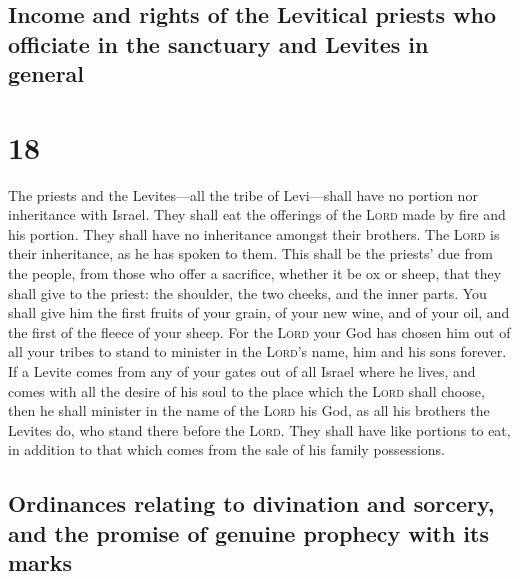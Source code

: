 \hypertarget{income-and-rights-of-the-levitical-priests-who-officiate-in-the-sanctuary-and-levites-in-general}{%
\subsection{Income and rights of the Levitical priests who officiate in
the sanctuary and Levites in
general}\label{income-and-rights-of-the-levitical-priests-who-officiate-in-the-sanctuary-and-levites-in-general}}

\hypertarget{section-17}{%
\section{18}\label{section-17}}

 The priests and the Levites---all the tribe of
Levi---shall have no portion nor inheritance with Israel. They shall eat
the offerings of the \textsc{Lord} made by fire and his portion.
 They shall have no inheritance amongst their brothers.
The \textsc{Lord} is their inheritance, as he has spoken to them.
 This shall be the priests' due from the people, from
those who offer a sacrifice, whether it be ox or sheep, that they shall
give to the priest: the shoulder, the two cheeks, and the inner parts.
 You shall give him the first fruits of your grain, of
your new wine, and of your oil, and the first of the fleece of your
sheep.  For the \textsc{Lord} your God has chosen him out
of all your tribes to stand to minister in the \textsc{Lord}'s name, him
and his sons forever.  If a Levite comes from any of your
gates out of all Israel where he lives, and comes with all the desire of
his soul to the place which the \textsc{Lord} shall choose,
 then he shall minister in the name of the \textsc{Lord}
his God, as all his brothers the Levites do, who stand there before the
\textsc{Lord}.  They shall have like portions to eat, in
addition to that which comes from the sale of his family possessions.

\hypertarget{ordinances-relating-to-divination-and-sorcery-and-the-promise-of-genuine-prophecy-with-its-marks}{%
\subsection{Ordinances relating to divination and sorcery, and the
promise of genuine prophecy with its
marks}\label{ordinances-relating-to-divination-and-sorcery-and-the-promise-of-genuine-prophecy-with-its-marks}}

